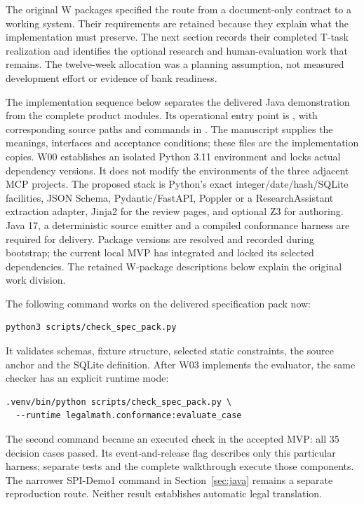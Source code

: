 \documentclass[12pt,a4paper,oneside,openany]{book}
\begin{document}
The original W packages specified the route from a document-only contract to
a working system. Their requirements are retained because they explain what the
implementation must preserve. The next section records their completed T-task
realization and identifies the optional research and human-evaluation work that
remains. The twelve-week allocation was a planning assumption, not measured
development effort or evidence of bank readiness.


\label{merge:P-04-prototype:02}


The implementation sequence below separates the delivered Java demonstration
from the complete product modules. Its operational entry point is
, with corresponding source paths and
commands in . The manuscript supplies the meanings,
interfaces and acceptance conditions; these files are the implementation copies.
W00 establishes an isolated
Python 3.11 environment and locks actual dependency versions. It does not modify
the environments of the three adjacent MCP projects. The proposed stack is
Python's exact integer/date/hash/SQLite facilities, JSON Schema, Pydantic/FastAPI,
Poppler or a ResearchAssistant extraction adapter, Jinja2 for the review pages,
and optional Z3 for authoring. Java 17, a deterministic source emitter and a
compiled conformance harness are required for delivery. Package versions are resolved and recorded during bootstrap;
the current local MVP has integrated and locked its selected dependencies.
The retained W-package descriptions below explain the original work division.

The following command works on the delivered specification pack now:
\begin{lstlisting}
python3 scripts/check_spec_pack.py
\end{lstlisting}
It validates schemas, fixture structure, selected static constraints, the source
anchor and the SQLite definition. After W03 implements the evaluator, the same
checker has an explicit runtime mode:
\begin{lstlisting}
.venv/bin/python scripts/check_spec_pack.py \
  --runtime legalmath.conformance:evaluate_case
\end{lstlisting}
The second command became an executed check in the accepted MVP: all 35
decision cases passed. Its event-and-release flag describes only this particular
harness; separate tests and the complete walkthrough execute those components.
The narrower SPI-Demo1 command in Section~\ref{sec:java} remains a separate
reproduction route. Neither result establishes automatic legal translation.
\end{document}
